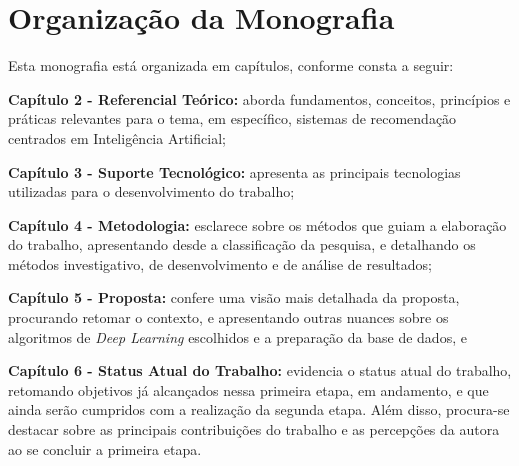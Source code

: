 \section{Organização da Monografia}\label{sec:organizacao}

Esta monografia está organizada em capítulos, conforme consta a seguir:

\textbf{Capítulo 2 - Referencial Teórico:} aborda fundamentos, conceitos, princípios e práticas
relevantes para o tema, em específico, sistemas de recomendação centrados em Inteligência Artificial;

\textbf{Capítulo 3 - Suporte Tecnológico:} apresenta as principais tecnologias utilizadas para
o desenvolvimento do trabalho;

\textbf{Capítulo 4 - Metodologia:} esclarece sobre os métodos que guiam a elaboração do trabalho, apresentando desde a classificação da 
pesquisa, e detalhando os métodos investigativo, de desenvolvimento e de análise de resultados;

\textbf{Capítulo 5 - Proposta:} confere uma visão mais detalhada da proposta, procurando retomar o contexto, e apresentando outras 
nuances sobre os algoritmos de \textit{Deep Learning} escolhidos e a preparação da base de dados, e

\textbf{Capítulo 6 - Status Atual do Trabalho:} evidencia o status atual do trabalho, retomando objetivos já alcançados nessa primeira 
etapa, em andamento, e que ainda serão cumpridos com a realização da segunda etapa. Além disso, procura-se destacar 
sobre as principais contribuições do trabalho e as percepções da autora ao se concluir a primeira etapa. 
